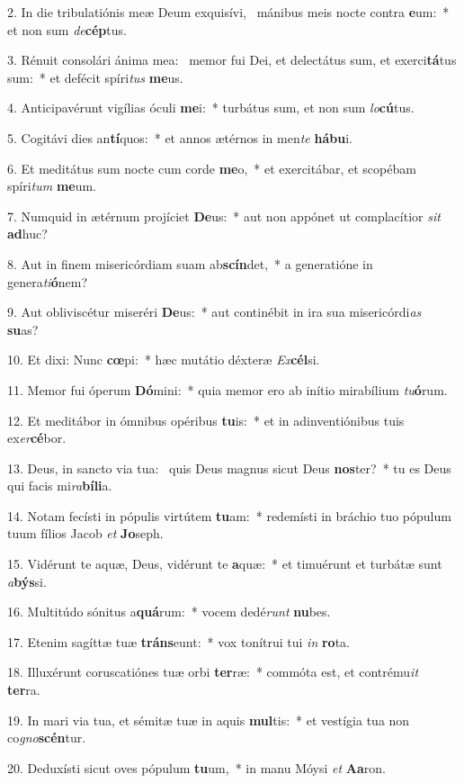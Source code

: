 2. In die tribulatiónis meæ Deum exquisívi, \dag\  mánibus meis nocte contra \textbf{e}um:~*  et non sum \textit{de}\textbf{cép}tus.\

3. Rénuit consolári ánima mea: \dag\  memor fui Dei, et delectátus sum, et exerci\textbf{tá}tus sum:~*  et defécit spíri\textit{tus} \textbf{me}us.\

4. Anticipavérunt vigílias óculi \textbf{me}i:~*  turbátus sum, et non sum \textit{lo}\textbf{cú}tus.\

5. Cogitávi dies an\textbf{tí}quos:~*  et annos ætérnos in men\textit{te} \textbf{há}\textbf{bu}i.\

6. Et meditátus sum nocte cum corde \textbf{me}o,~*  et exercitábar, et scopébam spíri\textit{tum} \textbf{me}um.\

7. Numquid in ætérnum projíciet \textbf{De}us:~*  aut non appónet ut complacítior \textit{sit} \textbf{ad}huc?\

8. Aut in finem misericórdiam suam ab\textbf{scín}det,~*  a generatióne in genera\textit{ti}\textbf{ó}nem?\

9. Aut obliviscétur miseréri \textbf{De}us:~*  aut continébit in ira sua misericórdi\textit{as} \textbf{su}as?\

10. Et dixi: Nunc \textbf{cœ}pi:~*  hæc mutátio déxteræ \textit{Ex}\textbf{cél}si.\

11. Memor fui óperum \textbf{Dó}mini:~*  quia memor ero ab inítio mirabílium \textit{tu}\textbf{ó}rum.\

12. Et meditábor in ómnibus opéribus \textbf{tu}is:~*  et in adinventiónibus tuis ex\textit{er}\textbf{cé}bor.\

13. Deus, in sancto via tua: \dag\  quis Deus magnus sicut Deus \textbf{nos}ter?~*  tu es Deus qui facis mi\textit{ra}\textbf{bí}\textbf{li}a.\

14. Notam fecísti in pópulis virtútem \textbf{tu}am:~*  redemísti in bráchio tuo pópulum tuum fílios Jacob \textit{et} \textbf{Jo}seph.\

15. Vidérunt te aquæ, Deus, vidérunt te \textbf{a}quæ:~*  et timuérunt et turbátæ sunt \textit{a}\textbf{býs}si.\

16. Multitúdo sónitus a\textbf{quá}rum:~*  vocem dedé\textit{runt} \textbf{nu}bes.\

17. Etenim sagíttæ tuæ \textbf{tráns}eunt:~*  vox tonítrui tui \textit{in} \textbf{ro}ta.\

18. Illuxérunt coruscatiónes tuæ orbi \textbf{ter}ræ:~*  commóta est, et contrému\textit{it} \textbf{ter}ra.\

19. In mari via tua, et sémitæ tuæ in aquis \textbf{mul}tis:~*  et vestígia tua non co\textit{gno}\textbf{scén}tur.\

20. Deduxísti sicut oves pópulum \textbf{tu}um,~*  in manu Móysi \textit{et} \textbf{A}\textbf{a}ron.\

